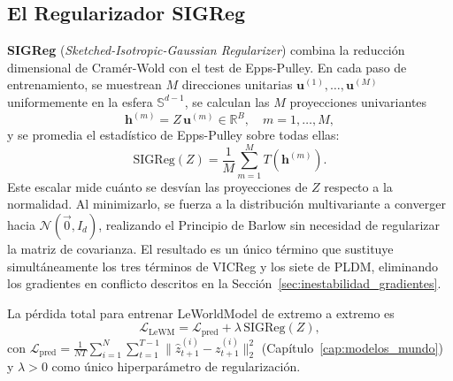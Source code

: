 \subsection{El Regularizador SIGReg}

\textbf{SIGReg} (\textit{Sketched-Isotropic-Gaussian Regularizer}) combina la reducción dimensional de Cramér-Wold con el test de Epps-Pulley. En cada paso de entrenamiento, se muestrean $M$ direcciones unitarias $\mathbf{u}^{(1)}, \dots, \mathbf{u}^{(M)}$ uniformemente en la esfera $\mathbb{S}^{d-1}$, se calculan las $M$ proyecciones univariantes
\begin{equation}
\mathbf{h}^{(m)} = Z\, \mathbf{u}^{(m)} \in \mathbb{R}^B, \quad m = 1, \dots, M,
\end{equation}
y se promedia el estadístico de Epps-Pulley sobre todas ellas:
\begin{equation}
\text{SIGReg}(Z) = \frac{1}{M} \sum_{m=1}^{M} T\!\left(\mathbf{h}^{(m)}\right).
\end{equation}
Este escalar mide cuánto se desvían las proyecciones de $Z$ respecto a la normalidad. Al minimizarlo, se fuerza a la distribución multivariante a converger hacia $\mathcal{N}(\vec{0}, I_d)$, realizando el Principio de Barlow sin necesidad de regularizar la matriz de covarianza. El resultado es un único término que sustituye simultáneamente los tres términos de VICReg y los siete de PLDM, eliminando los gradientes en conflicto descritos en la Sección~\ref{sec:inestabilidad_gradientes}.

La pérdida total para entrenar LeWorldModel de extremo a extremo es
\begin{equation}
\mathcal{L}_{\text{LeWM}} = \mathcal{L}_{\text{pred}} + \lambda\, \text{SIGReg}(Z),
\end{equation}
con $\mathcal{L}_{\text{pred}} = \frac{1}{NT} \sum_{i=1}^{N} \sum_{t=1}^{T-1} \| \hat{z}_{t+1}^{(i)} - z_{t+1}^{(i)} \|_2^2$ (Capítulo~\ref{cap:modelos_mundo}) y $\lambda > 0$ como único hiperparámetro de regularización.


